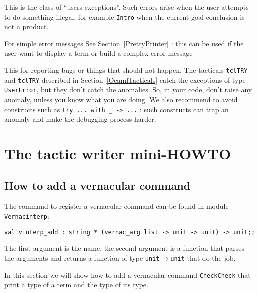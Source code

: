 \begin{description}
    {This is the class of ``users exceptions''. Such errors arise when 
      the user attempts to do something illegal, for example \texttt{Intro}
      when the current goal conclusion is not a product.}

    {For simple error messages}
    {See Section~\ref{PrettyPrinter} : this can be used if the user
      want to display a term or build a complex error message}

    {This for reporting bugs or things that should not
      happen. The tacticals \texttt{tclTRY} and
      \texttt{tclTRY} described in Section~\ref{OcamlTacticals} catch the
      exceptions of type \texttt{UserError}, but they don't catch the
      anomalies. So, in your code, don't raise any anomaly, unless you
      know what you are doing. We also recommend to avoid constructs
      such as \texttt{try ... with \_ -> ...} : such constructs can trap 
      an anomaly and make the debugging process harder.}

\end{description}

\section{The tactic writer mini-HOWTO}

\subsection{How to add a vernacular command}

The command to register a vernacular command can be found
in module \texttt{Vernacinterp}:

\begin{verbatim}
val vinterp_add : string * (vernac_arg list -> unit -> unit) -> unit;;
\end{verbatim}

The first argument is the name, the second argument is a function that
parses the arguments and returns a function of type
\texttt{unit}$\rightarrow$\texttt{unit} that do the job.

In this section we will show how to add a vernacular command
\texttt{CheckCheck} that print a type of a term and the type of its
type.

